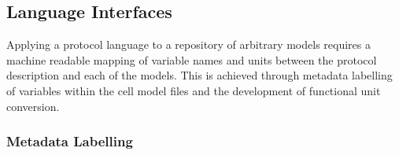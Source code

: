 \documentclass[preprint,authoryear,12pt]{elsarticle}
\newcommand{\secref}[1]{Section~\ref{#1}}
\begin{document}
% 
% 

\subsection{Language Interfaces}
\label{sec:methods-interfaces}


Applying a protocol language to a repository of arbitrary models requires a machine readable mapping of variable names and units between the protocol description and each of the models.
This is achieved through metadata labelling of variables within the cell model files and the development of functional unit conversion.

\subsubsection{Metadata Labelling}
\label{sec:methods-ontologies}
\end{document}

